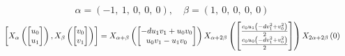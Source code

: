 \documentclass[11pt]{article}
\theoremstyle{definition}
\begin{document}
\[
\alpha = \left( -1, \  1, \  0, \  0, \  0\right), \quad \beta = \left( 1, \  0, \  0, \  0, \  0\right)
\]
\[
\scaletoalign{\textwidth}{\left[ X_{\alpha}\left(\left[\begin{matrix}u_{0}\\u_{1}\end{matrix}\right]\right), X_{\beta}\left(\left[\begin{matrix}v_{0}\\v_{1}\end{matrix}\right]\right) \right] = X_{\alpha + \beta}\left(\left[\begin{matrix}- d u_{1} v_{1} + u_{0} v_{0}\\u_{0} v_{1} - u_{1} v_{0}\end{matrix}\right]\right) X_{\alpha + 2\beta}\left(\left[\begin{matrix}\frac{c_{0} u_{1} \left(- d v_{1}^{2} + v_{0}^{2}\right)}{2}\\\frac{c_{0} u_{0} \left(- d v_{1}^{2} + v_{0}^{2}\right)}{2}\end{matrix}\right]\right) X_{2\alpha + 2\beta}\left(0\right)}
\]
\end{document}
